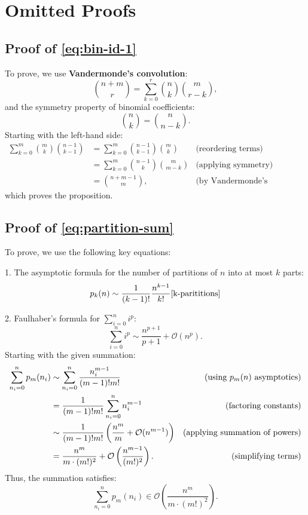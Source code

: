 \chapter{Omitted Proofs} \label{apx:omitted-proofs}


\section{Proof of \autoref{eq:bin-id-1}} \label{apx:proof-bin-id-1}

To prove, we use \textbf{Vandermonde's convolution}:
\[
    \binom{n + m}{r} = \sum_{k=0}^r \binom{n}{k} \binom{m}{r-k},
\]
and the symmetry property of binomial coefficients:
\[
    \binom{n}{k} = \binom{n}{n-k}.
\]
Starting with the left-hand side:
\begin{align*}
    \sum_{k=0}^m \binom{m}{k} \binom{n-1}{k-1}
    &= \sum_{k=0}^m \binom{n-1}{k-1} \binom{m}{k} & \text{(reordering terms)} \\
    &= \sum_{k=0}^m \binom{n-1}{k} \binom{m}{m-k} & \text{(applying symmetry)} \\
    &= \binom{n + m - 1}{m}, & \text{(by Vandermonde's convolution)}
\end{align*}
which proves the proposition.


\section{Proof of \autoref{eq:partition-sum}} \label{apx:proof-partition-sum}

To prove, we use the following key equations:

1. The asymptotic formula for the number of partitions of \(n\) into at most \(k\) parts:
\[
    p_k(n) \sim \frac{1}{(k-1)!} \frac{n^{k-1}}{k!} \cite{k-parititions}
\]

2. Faulhaber's formula for \( \sum_{i=0}^n i^p \):
\[
    \sum_{i=0}^n i^p \sim \frac{n^{p+1}}{p+1} + \mathcal{O}(n^p).
\]
Starting with the given summation:
\begin{align*}
    \sum_{n_i=0}^n p_m(n_i)
    &\sim \sum_{n_i=0}^n \frac{n_i^{m-1}}{(m-1)!m!} & \text{(using \( p_m(n) \) asymptotics)} \\
    &= \frac{1}{(m-1)! m!} \sum_{n_i=0}^n n_i^{m-1} & \text{(factoring constants)} \\
    &\sim \frac{1}{(m-1)! m!} \left( \frac{n^m}{m} + \mathcal{O}(n^{m-1}) \right) & \text{(applying summation of powers)} \\
    &= \frac{n^m}{m \cdot (m!)^2} + \mathcal{O}\left(\frac{n^{m-1}}{(m!)^2}\right). & \text{(simplifying terms)}
\end{align*}
Thus, the summation satisfies:
\[
    \sum_{n_i=0}^n p_m(n_i) \in \mathcal{O}\left(\frac{n^m}{m \cdot (m!)^2}\right).
\]
